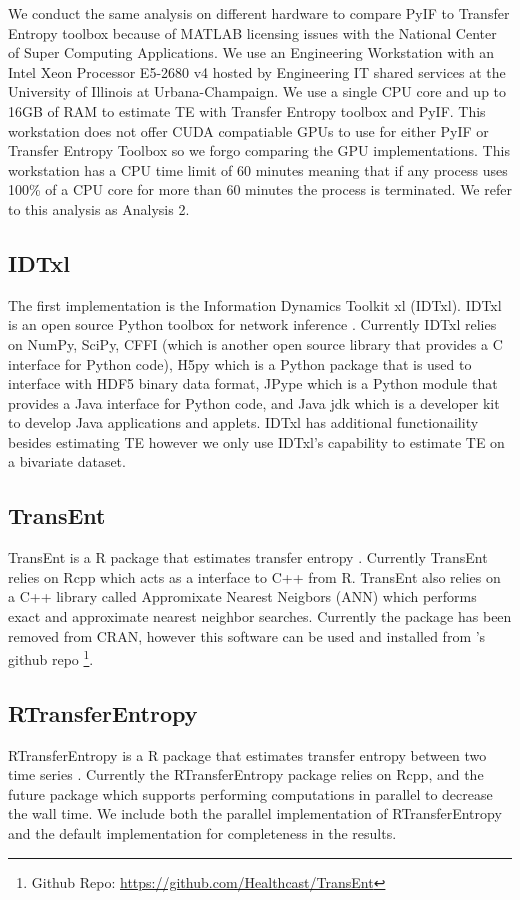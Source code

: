 \documentclass[conference]{IEEEtran}
\begin{document}
We conduct the same analysis on different hardware to compare PyIF to Transfer Entropy toolbox because of MATLAB licensing issues with the National Center of Super Computing Applications. We use an Engineering Workstation with an Intel Xeon Processor E5-2680 v4  hosted by Engineering IT shared services at the University of Illinois at Urbana-Champaign. We use a single CPU core and up to 16GB of RAM to estimate TE with Transfer Entropy toolbox and PyIF. This workstation does not offer CUDA compatiable GPUs to use for either PyIF or Transfer Entropy Toolbox so we forgo comparing the GPU implementations. This workstation has a CPU time limit of 60 minutes meaning that if any process uses 100\% of a CPU core for more than 60 minutes the process is terminated. We refer to this analysis as Analysis 2.

\subsection{IDTxl}
The first implementation is the Information Dynamics Toolkit xl (IDTxl). IDTxl is an open source Python toolbox for network inference \cite{IDTxl}. Currently IDTxl relies on NumPy, SciPy, CFFI (which is another open source library that provides a C interface for Python code), H5py which is a Python package that is used to interface with HDF5 binary data format, JPype which is a Python module that provides a Java interface for Python code, and Java jdk which is a developer kit to develop Java applications and applets. IDTxl has additional functionaility besides estimating TE however we only use IDTxl's capability to estimate TE on a bivariate dataset.


\subsection{TransEnt}
TransEnt is a R package that estimates transfer entropy \cite{TransEnt}. Currently TransEnt relies on Rcpp which acts as a interface to C++ from R. TransEnt also relies on  a C++ library called Appromixate Nearest Neigbors (ANN) \cite{ANN} which performs exact and approximate nearest neighbor searches. Currently the package has been removed from CRAN, however this software can be used and installed from \cite{TransEnt}'s github repo \footnote{\cite{TransEnt} Github Repo: \url{https://github.com/Healthcast/TransEnt}}.

\subsection{RTransferEntropy}
RTransferEntropy is a R package that estimates transfer entropy between two time series \cite{RTransferEntropy}. Currently the RTransferEntropy package relies on Rcpp, and the future package which supports performing computations in parallel to decrease the wall time. We include both the parallel implementation of RTransferEntropy and the default implementation for completeness in the results.
\end{document}
